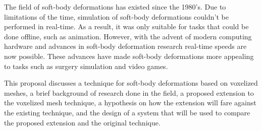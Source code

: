 \begin{abstractpage}
The field of soft-body deformations has existed since the 1980's. Due to limitations of the time,
simulation of soft-body deformations couldn't be performed in real-time. As a result, it was only 
suitable for tasks that could be done offline, such as animation. However, with the advent of 
modern computing hardware and advances in soft-body deformation research real-time speeds are now
possible. These advances have made soft-body deformations more appealing to tasks such as surgery 
simulation and video games.

This proposal discusses a technique for soft-body deformations based on voxelized meshes, a brief
background of research done in the field, a proposed extension to the voxelized mesh technique, a 
hypothesis on how the extension will fare against the existing technique, and the design of a system
that will be used to compare the proposed extension and the original technique.
\end{abstractpage}
